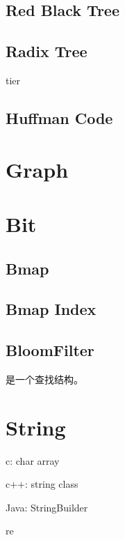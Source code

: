\subsection{Red Black Tree}

\subsection{Radix Tree}

tier

\subsection{Huffman Code}

\section{Graph}

\section{Bit}

\subsection{Bmap}

\subsection{Bmap Index}

\subsection{BloomFilter}

是一个查找结构。

\section{String}

\begin{enumbox}
\item c: char array
\item c++: string class
\item Java: StringBuilder
\item re
\end{enumbox}
